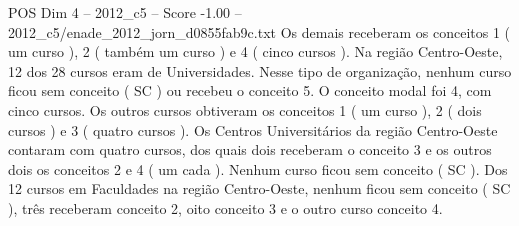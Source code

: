 \begin{textsample}{POS Dim 4 – 2012\_c5 – Score -1.00 – 2012\_c5/enade\_2012\_jorn\_d0855fab9c.txt}
Os demais receberam os conceitos 1 ( um curso ), 2 ( também um curso ) e 4 ( cinco cursos ).
Na região Centro-Oeste, 12 dos 28 cursos eram de Universidades.
Nesse tipo de organização, nenhum curso ficou sem conceito ( SC ) ou recebeu o conceito 5.
O conceito modal foi 4, com cinco cursos.
Os outros cursos obtiveram os conceitos 1 ( um curso ), 2 ( dois cursos ) e 3 ( quatro cursos ).
Os Centros Universitários da região Centro-Oeste contaram com quatro cursos, dos quais dois receberam o conceito 3 e os outros dois os conceitos 2 e 4 ( um cada ).
Nenhum curso ficou sem conceito ( SC ).
Dos 12 cursos em Faculdades na região Centro-Oeste, nenhum ficou sem conceito ( SC ), três receberam conceito 2, oito conceito 3 e o outro curso conceito 4.

\end{textsample}
